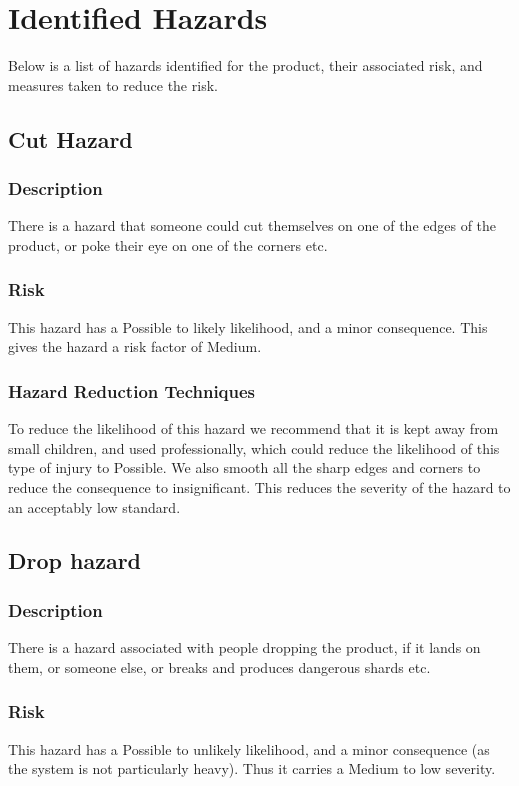 \documentclass[]{report}
\begin{document}
\section{Identified Hazards}
Below is a list of hazards identified for the product, their associated risk, and measures taken to reduce the risk.


\subsection{Cut Hazard}
\subsubsection{Description}
There is a hazard that someone could cut themselves on one of the edges of the product, or poke their eye on one of the corners etc.

\subsubsection{Risk}
This hazard has a Possible to likely likelihood, and a minor consequence. This gives the hazard a risk factor of Medium.

\subsubsection{Hazard Reduction Techniques}
To reduce the likelihood of this hazard we recommend that it is kept away from small children, and used professionally, which could reduce the likelihood of this type of injury to Possible. We also smooth all the sharp edges and corners to reduce the consequence to insignificant. This reduces the severity of the hazard to an acceptably low standard.

\subsection{Drop hazard}
\subsubsection{Description}
There is a hazard associated with people dropping the product, if it lands on them, or someone else, or breaks and produces dangerous shards etc.

\subsubsection{Risk}
This hazard has a Possible to unlikely likelihood, and a minor consequence (as the system is not particularly heavy). Thus it carries a Medium to low severity.
\end{document}
